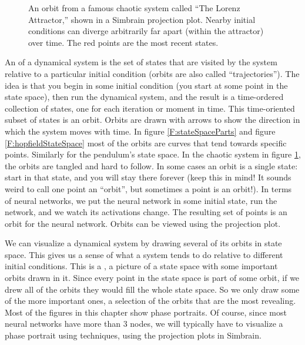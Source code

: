 \begin{figure}[h]
\centering
{}
\caption[Simbrain screenshot.]{An orbit from a famous chaotic system called ``The Lorenz Attractor,'' shown in a Simbrain projection plot. Nearby initial conditions can diverge arbitrarily far apart (within the attractor) over time. The red points are the most recent states.}
\label{F:chaoticStateSpace}
\end{figure}

An  of a dynamical system is the set of states that are visited by the system relative to a particular initial condition (orbits are also called ``trajectories''). The idea is that you begin in some initial condition (you start at some point  in the state space), then run the dynamical system, and the result is a time-ordered collection of states, one for each iteration or moment in time. This time-oriented subset of states is an orbit. Orbits are drawn with arrows to show the direction in which the system moves with time. In figure \ref{F:stateSpaceParts} and figure \ref{F:hopfieldStateSpace} most of the orbits are curves that tend towards specific points. Similarly for the pendulum's state space. In the chaotic system in figure \ref{F:chaoticStateSpace}, the orbits are tangled and hard to follow. In some cases an orbit is a single state: start in that state, and you will stay there forever (keep this in mind! It sounds weird to call one point an ``orbit'', but sometimes a point is an orbit!). In terms of  neural networks, we put the neural network in some initial state, run the network, and we watch its activations change. The resulting set of points is an orbit for the neural network. Orbits can be viewed using the projection plot.

We can visualize a dynamical system by drawing several of its orbits in  state space. This gives us a sense of what a system tends to do relative to different initial conditions. This is a  , a picture of a state space with some important orbits drawn in it. Since every point in the state space is part of some orbit, if we drew all of  the orbits they would fill the whole state space. So we only draw some of the  more important ones, a selection of the orbits that are the most revealing. Most of the figures in this chapter show phase portraits. Of course, since most neural networks have more than 3 nodes, we will  typically have to visualize a phase portrait using  techniques, using the  projection plots in Simbrain.

